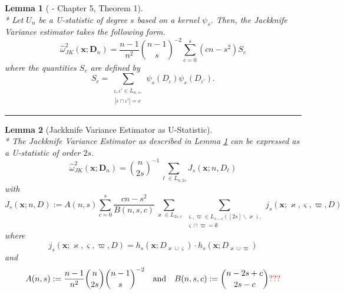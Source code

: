 \documentclass[letterpaper,10pt]{article}
\numberwithin{equation}{section}
\numberwithin{thm}{section}
\newtheorem{lem}{Lemma}
\numberwithin{lem}{section}
\numberwithin{cor}{section}
\renewcommand{\hat}{\widehat}
\newcommand{\1}{\mathbbm{1}}
\begin{document}
\begin{lem}[\citet{lee_u-statistics_2019} - Chapter 5, Theorem 1]\label{thm:lee_ch5_1}\mbox{}\\*
	Let $U_n$ be a U-statistic of degree $s$ based on a kernel $\psi_s$.
	Then, the Jackknife Variance estimator takes the following form.
	\begin{equation}
		\hat{\omega}^{2}_{JK}\left(\mathbf{x}; \mathbf{D}_n\right)
		= \frac{n-1}{n^2}\binom{n-1}{s}^{-2}\sum_{c = 0}^{s}\left(cn - s^2\right)S_c
	\end{equation}
	where the quantities $S_c$ are defined by
	\begin{equation}
		S_c
		= \sum_{\substack{\iota, \iota' \in L_{n,s}, \\ \, |\iota \cap \iota'| = c}}
		\psi_{s}(D_{\iota})\psi_{s}(D_{\iota'}).
	\end{equation}
\end{lem}

\hrule

\begin{lem}[Jackknife Variance Estimator as U-Statistic]\label{lem:JK_as_U_Stat}\mbox{}\\*
	The Jackknife Variance Estimator as described in Lemma \ref{thm:lee_ch5_1} can be expressed as a U-statistic of order $2s$.
	\begin{equation}
		\hat{\omega}^{2}_{JK}\left(\mathbf{x}; \mathbf{D}_n\right)
		= \binom{n}{2s}^{-1} \sum_{\ell \in L_{n, 2 s}}J_{s}\left(\mathbf{x}; n, D_\ell\right)
	\end{equation}
	with
	\begin{equation}
		J_{s}\left(\mathbf{x}; n, D\right)
		:= A(n, s)
		\sum_{c = 0}^{s} \frac{cn - s^2}{B(n, s, c)}
		\sum_{\varkappa \in L_{2 s, c}}
		\sum_{\substack{\varsigma, \varpi \in L_{s - c}([2 s] \backslash \varkappa),\\
				\varsigma \cap \varpi = \emptyset}}
		j_{s}\left(\mathbf{x}; \varkappa, \varsigma, \varpi, D\right)
	\end{equation}
	where
	\begin{equation}
		j_{s}\left(\mathbf{x}; \varkappa, \varsigma, \varpi, D\right) =
		h_{s}(\mathbf{x}; D_{\varkappa \cup \varsigma}) \cdot
		h_{s}(\mathbf{x};D_{\varkappa \cup \varpi})
	\end{equation}
	and
	\begin{equation}
		A(n, s) := \frac{n-1}{n^2} \binom{n}{2s} \binom{n-1}{s}^{-2}
		\quad \text{and} \quad
		B(n, s, c) := \binom{n-2s+c}{2s - c}{\color{red} \text{???}}
	\end{equation}
\end{lem}
\end{document}
